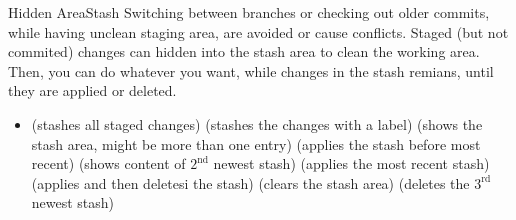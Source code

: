 \begin{frame}{Hidden Area}{Stash}
  {\footnotesize Switching between branches or checking out older commits, while having unclean staging area, 
  are avoided or cause conflicts. Staged (but not commited) changes can hidden into the stash area to clean the  working area. Then, you can do whatever 
you want, while changes in the stash remians, until they are applied or deleted.}
\begin{itemize}
\item 
    (stashes all staged changes)
    (stashes the changes with a label)
   (shows the stash area, might be more than one entry)
   (applies the stash before most recent)
   (shows content of $2^{\text{nd}}$ newest stash)
   (applies the most recent stash)
   (applies and then deletesi the stash)
   (clears the stash area)
   (deletes the $3^\text{rd}$ newest stash)
\end{itemize}
\end{frame}
